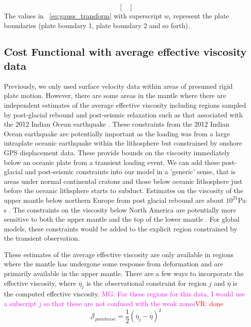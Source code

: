 \documentclass[12pt]{article}
\newcommand{\mgnote}[1]{\textcolor{magenta}{MG: #1}}
\newcommand{\vrnote}[1]{\textcolor{red}{VR: #1}}
\begin{document}
{\begin{equation}
\begin{bmatrix}
\end{bmatrix}
\label{eq:gauss_transform}
\end{equation}
The values in ~\eqref{eq:gauss_transform} with superscript $w_i$ represent the  plate boundaries (plate boundary 1, plate boundary 2 and so forth).

\subsection*{Cost Functional with average effective viscosity data}

Previously, we \citep{ratnaswamy2015adjoint} only used surface velocity data within areas of presumed rigid plate motion. 
However, there are some areas in the mantle where there are independent estimates of the average effective viscosity including regions sampled by post-glacial rebound and post-seismic relaxation such as that associated with the 2012 Indian Ocean earthquake \citep{hu2016asthenosphere}.  
These constraints from the 2012 Indian Ocean earthquake are potentially important as the loading was from a large intraplate oceanic earthquake within the lithosphere but constrained by onshore GPS displacement data. These provide bounds on the viscosity immediately below an oceanic plate from a transient loading event. We can add these post-glacial and post-seismic constraints into our model in a 'generic' sense, that is areas under normal continental cratons and those below oceanic lithosphere just before the oceanic lithsphere starts to subduct. Estimates on the viscosity of the upper mantle below northern Europe from post glacial rebound are about $10^{21}$Pa$\cdot$s \citep{hu2016asthenosphere}. The constraints on the viscosity below North America are potentially more sensitive to both the upper mantle and the top of the lower mantle \citep{mitrovica1995constraints,simons1997localization}. For global models, these constraints would be added to the explicit region constrained by the transient observation.

These estimates of the average effective viscosity are only available in regions where the mantle has undergone some response from deformation and are primarily available in the upper mantle.   There are a few ways to incorporate the effective viscosity, where $\overline{\eta}_j$ is the observational constraint for region $j$ and $\eta$ is the computed effective viscosity. \mgnote{For these regions for this data, I would use a subscript $j$ so that these are not confused with the weak zones}\vrnote{done}
\begin{equation}
   \mathcal{J}_{pointwise}=  \frac{1}{2}(\overline{\eta}_j - \eta)^{2}
\label{eq:pointwise}
\end{equation}

}
\end{document}
